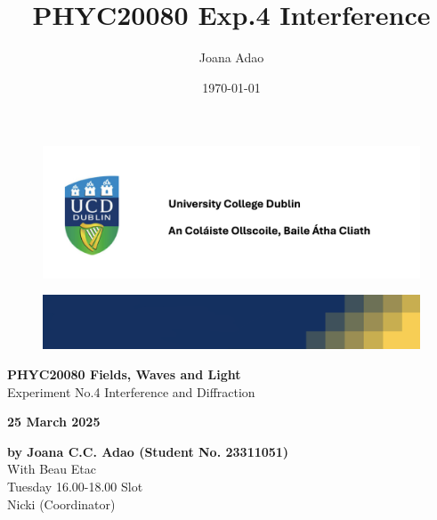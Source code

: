 \documentclass[12pt]{article}
\title{PHYC20080 Exp.4 Interference}
\author{Joana Adao}
\date{\today}
\begin{document}
\begin{titlepage}
    \begin{center}

        \begin{figure}[ht]
            \includegraphics[width=\textwidth]{UCDLogo.png}
        \end{figure}
        
        \begin{figure}
            \centerline{\includegraphics[width=\paperwidth]{UCDBanner.png}}
        \end{figure}

        \vspace{4cm}

        {\LARGE \bfseries PHYC20080 Fields, Waves and Light}\\
        \vspace{0.75cm}
        {\Large Experiment No.4 Interference and Diffraction}
        
        \vspace{1cm}
    
    {\Large \textbf{25 March 2025}}
    
    \vspace{2cm}
    
    {\large \textbf{by Joana C.C. Adao (Student No. 23311051)}}\\
    \vspace{.25cm}
    {\large With Beau Etac}\\
    \vspace{0.25cm}
    {\large Tuesday 16.00-18.00 Slot}\\
    {\large Nicki (Coordinator)}

    \end{center}
    
   \clearpage

\end{titlepage}
\end{document}

